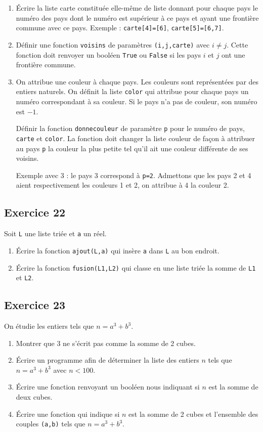 \documentclass[10pt,fleqn]{article} %
\begin{document}
\begin{multicols}{2}
\begin{enumerate}
\item Écrire la liste carte constituée elle-même de liste donnant pour chaque pays le numéro des pays dont le numéro est supérieur à ce pays et ayant une frontière commune avec ce pays. Exemple : \texttt{carte[4]=[6]}, \texttt{carte[5]=[6,7]}.
\item Définir une fonction \texttt{voisins} de paramètres \texttt{(i,j,carte)} avec $i\neq j$. Cette fonction doit renvoyer un booléen \texttt{True} ou \texttt{False} si les pays $i$ et $j$ ont une frontière commune.
\item On attribue une couleur à chaque pays. Les couleurs sont représentées par des entiers naturels. On définit la liste \texttt{color} qui attribue pour chaque pays un numéro correspondant à sa couleur. Si le pays n'a pas de couleur, son numéro est $-1$. 

Définir la fonction \texttt{donnecouleur} de paramètre \texttt{p} pour le numéro de pays, \texttt{carte} et \texttt{color}. La fonction doit changer la liste couleur de façon à attribuer au pays \texttt{p} la couleur la plus petite tel qu'il ait une couleur différente de ses voisins. 

Exemple avec 3 : le pays 3 correspond à \texttt{p=2}. Admettons que les pays 2 et 4 aient respectivement les couleurs 1 et 2, on attribue à 4 la couleur 2. 
\end{enumerate}

\subsection*{Exercice 22}
Soit \texttt{L} une liste triée et \texttt{a} un réel. 
\begin{enumerate}
\item Écrire la fonction \texttt{ajout(L,a)} qui insère \texttt{a} dans \texttt{L} au bon endroit. 
\item Écrire la fonction \texttt{fusion(L1,L2)} qui classe en une liste triée la somme de \texttt{L1} et \texttt{L2}.
\end{enumerate}



\subsection*{Exercice 23}
On étudie les entiers tels que $n=a^3+b^3$. 
\begin{enumerate}
\item Montrer que $3$ ne s'écrit pas comme la somme de 2 cubes.
\item Écrire un programme afin de déterminer la liste des entiers $n$ tels que $n=a^3+b^3$ avec $n<100$.
\item Écrire une fonction renvoyant un booléen nous indiquant si $n$ est la somme de deux cubes. 
\item Écrire une fonction qui indique si $n$ est la somme de 2 cubes et l'ensemble des couples \texttt{(a,b)} tels que $n=a^3+b^3$.
\end{enumerate}


\end{multicols}
\end{document}
